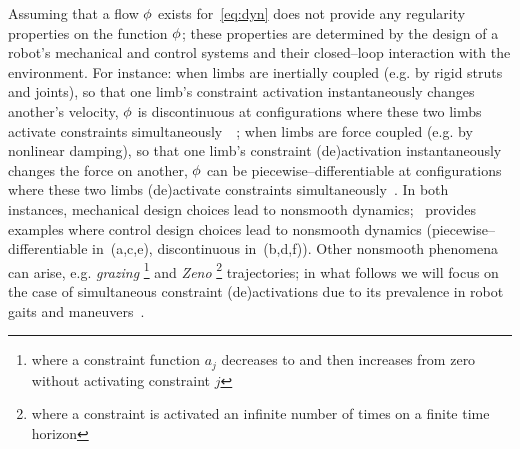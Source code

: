 \documentclass{article}
\begin{document}
Assuming that a flow $\phi$ exists for~\eqref{eq:dyn} does not provide any regularity properties on the function $\phi$;
these properties are determined by 
the design of a robot's mechanical and control systems 
and
their closed--loop interaction with the environment.
For instance: 
when limbs are inertially coupled (e.g. by rigid struts and joints), so that one limb's constraint activation instantaneously changes another's velocity, $\phi$ is discontinuous at configurations where these two limbs activate constraints simultaneously~\cite[Table~3]{Remy2010-vo}~\cite{Hurmuzlu1994-wk};
when limbs are force coupled (e.g. by nonlinear damping), so that one limb's constraint (de)activation instantaneously changes the force on another, $\phi$ can be piecewise--differentiable at configurations where these two limbs (de)activate constraints simultaneously~\cite[Fig.~1]{Pace2017-tt}.
In both instances, mechanical design choices lead to nonsmooth dynamics;~ provides examples where control design choices lead to nonsmooth dynamics (piecewise--differentiable in~(a,c,e), discontinuous in~(b,d,f)).
Other nonsmooth phenomena can arise, e.g. 
\emph{grazing}%
\footnote{where a constraint function $a_j$ decreases to and then increases from zero without activating constraint $j$}
and
\emph{Zeno}%
\footnote{where a constraint is activated an infinite number of times on a finite time horizon}
trajectories;
in what follows we will focus on the case of simultaneous constraint (de)activations due to its prevalence in robot gaits and maneuvers~. 
\end{document}

